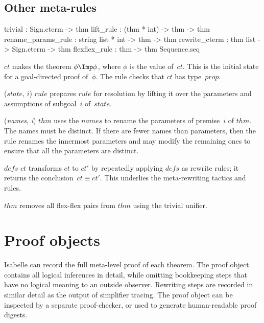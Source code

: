 \subsection{Other meta-rules}
\begin{ttbox} 
trivial            : Sign.cterm -> thm
lift_rule          : (thm * int) -> thm -> thm
rename_params_rule : string list * int -> thm -> thm
rewrite_cterm      : thm list -> Sign.cterm -> thm
flexflex_rule      : thm -> thm Sequence.seq
\end{ttbox}
\begin{ttdescription}
\item[\ttindexbold{trivial} $ct$] 
makes the theorem \(\phi\Imp\phi\), where $\phi$ is the value of~$ct$.
This is the initial state for a goal-directed proof of~$\phi$.  The rule
checks that $ct$ has type~$prop$.

\item[\ttindexbold{lift_rule} ($state$, $i$) $rule$] 
prepares $rule$ for resolution by lifting it over the parameters and
assumptions of subgoal~$i$ of~$state$.

\item[\ttindexbold{rename_params_rule} ({\it names}, {\it i}) $thm$] 
uses the $names$ to rename the parameters of premise~$i$ of $thm$.  The
names must be distinct.  If there are fewer names than parameters, then the
rule renames the innermost parameters and may modify the remaining ones to
ensure that all the parameters are distinct.

\item[\ttindexbold{rewrite_cterm} $defs$ $ct$]
transforms $ct$ to $ct'$ by repeatedly applying $defs$ as rewrite rules; it
returns the conclusion~$ct\equiv ct'$.  This underlies the meta-rewriting
tactics and rules.

\item[\ttindexbold{flexflex_rule} $thm$]  
removes all flex-flex pairs from $thm$ using the trivial unifier.
\end{ttdescription}


\section{Proof objects}\label{sec:proofObjects}
 Isabelle can record the full meta-level proof of each
theorem.  The proof object contains all logical inferences in detail, while
omitting bookkeeping steps that have no logical meaning to an outside
observer.  Rewriting steps are recorded in similar detail as the output of
simplifier tracing.  The proof object can be inspected by a separate
proof-checker, or used to generate human-readable proof digests.

